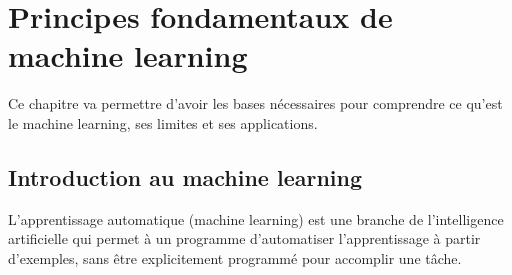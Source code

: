 \chapter{Principes fondamentaux de machine learning}
\label{chap:fondamentaux_ml}

\par{Ce chapitre va permettre d’avoir les bases nécessaires pour comprendre ce qu’est le machine learning, ses limites et ses applications.}


\section{Introduction au machine learning}

\par{L'apprentissage automatique (machine learning) est une branche de l'intelligence artificielle qui permet à un programme d'automatiser l'apprentissage à partir d'exemples, sans être explicitement programmé pour accomplir une tâche.}


